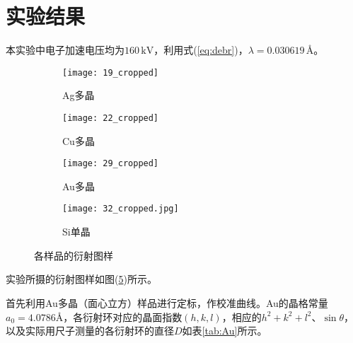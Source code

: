 \documentclass[aps,pre,12pt,preprint,onecolumn,showpacs,showkeys]{revtex4-1}
\begin{document}
\section{实验结果}
    本实验中电子加速电压均为$160\,\mathrm{kV}$，利用式(\ref{eq:debr})，$\lambda=0.030619\,\text{\AA}$。
    \begin{figure}[ht]
	\centering
		\begin{subfigure}[t]{75mm}
			\centering
			\texttt{[image: 19\_cropped]}
			\caption{Ag多晶}\label{fig:19}
		\end{subfigure}
		\begin{subfigure}[t]{75mm}
			\centering
			\texttt{[image: 22\_cropped]}
			\caption{Cu多晶}\label{fig:22}
		\end{subfigure}
		\begin{subfigure}[t]{75mm}
			\centering
			\texttt{[image: 29\_cropped]}
			\caption{Au多晶}\label{fig:29}
		\end{subfigure}
		\begin{subfigure}[t]{75mm}
			\centering
			\texttt{[image: 32\_cropped.jpg]}
			\caption{Si单晶}\label{fig:32}
		\end{subfigure}
		\caption{各样品的衍射图样}\label{fig:yanshe}
    \end{figure}
    实验所摄的衍射图样如图(\ref{fig:yanshe})所示。

    首先利用Au多晶（面心立方）样品进行定标，作校准曲线。Au的晶格常量$a_0=4.0786\text{\AA}$，各衍射环对应的晶面指数$(h,k,l)$，相应的$h^2 +k^2+ l^2$、$\sin \theta$，以及实际用尺子测量的各衍射环的直径$D$如表\ref{tab:Au}所示。
\end{document}
